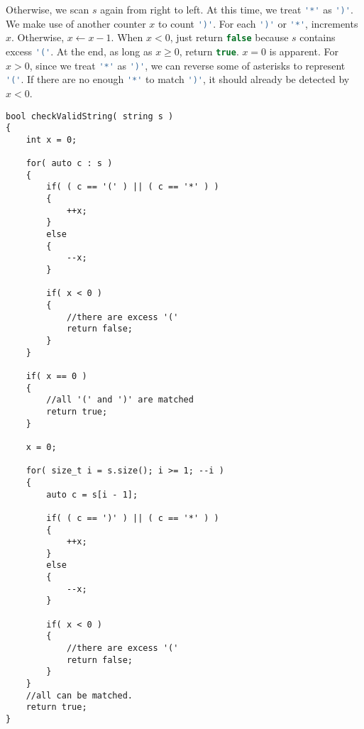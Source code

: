 Otherwise, we scan $s$ again from right to left. At this time, we treat \lstinline[language=C++, basicstyle=\small\ttfamily, keywordstyle=\bfseries\color{green!40!black}]|'*'| as \lstinline[language=C++, basicstyle=\small\ttfamily, keywordstyle=\bfseries\color{green!40!black}]|')'|. We make use of another counter $x$ to count \lstinline[language=C++, basicstyle=\small\ttfamily, keywordstyle=\bfseries\color{green!40!black}]|')'|. For each \lstinline[language=C++, basicstyle=\small\ttfamily, keywordstyle=\bfseries\color{green!40!black}]|')'| or \lstinline[language=C++, basicstyle=\small\ttfamily, keywordstyle=\bfseries\color{green!40!black}]|'*'|, increments $x$. Otherwise, $x\gets x-1$. When $x<0$, just return \lstinline[language=C++, basicstyle=\small\ttfamily, keywordstyle=\bfseries\color{green!40!black}]|false| because $s$ contains excess \lstinline[language=C++, basicstyle=\small\ttfamily, keywordstyle=\bfseries\color{green!40!black}]|'('|. At the end, as long as $x\geq 0$, return \lstinline[language=C++, basicstyle=\small\ttfamily, keywordstyle=\bfseries\color{green!40!black}]|true|. $x=0$ is apparent. For $x>0$, since we treat \lstinline[language=C++, basicstyle=\small\ttfamily, keywordstyle=\bfseries\color{green!40!black}]|'*'| as \lstinline[language=C++, basicstyle=\small\ttfamily, keywordstyle=\bfseries\color{green!40!black}]|')'|, we can reverse some of asterisks to represent \lstinline[language=C++, basicstyle=\small\ttfamily, keywordstyle=\bfseries\color{green!40!black}]|'('|. If there are no enough \lstinline[language=C++, basicstyle=\small\ttfamily, keywordstyle=\bfseries\color{green!40!black}]|'*'| to match \lstinline[language=C++, basicstyle=\small\ttfamily, keywordstyle=\bfseries\color{green!40!black}]|')'|, it should already be detected by $x<0$.

\begin{lstlisting}[style=customc, caption={Scan Twice}]
bool checkValidString( string s )
{
    int x = 0;

    for( auto c : s )
    {
        if( ( c == '(' ) || ( c == '*' ) )
        {
            ++x;
        }
        else
        {
            --x;
        }

        if( x < 0 )
        {
            //there are excess '('
            return false;
        }
    }

    if( x == 0 )
    {
        //all '(' and ')' are matched
        return true;
    }

    x = 0;

    for( size_t i = s.size(); i >= 1; --i )
    {
        auto c = s[i - 1];

        if( ( c == ')' ) || ( c == '*' ) )
        {
            ++x;
        }
        else
        {
            --x;
        }

        if( x < 0 )
        {
            //there are excess '('
            return false;
        }
    }
    //all can be matched.
    return true;
}
\end{lstlisting}